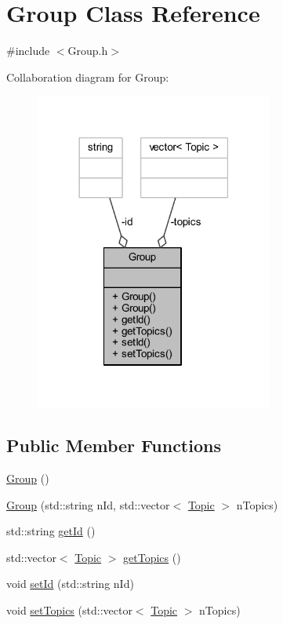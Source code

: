 \hypertarget{class_group}{}\section{Group Class Reference}
\label{class_group}


{\ttfamily \#include $<$Group.\+h$>$}



Collaboration diagram for Group\+:\nopagebreak
\begin{figure}[H]
\begin{center}
\leavevmode
\includegraphics[width=222pt]{class_group__coll__graph}
\end{center}
\end{figure}
\subsection*{Public Member Functions}
\begin{DoxyCompactItemize}
\item 
\hyperlink{class_group_a7b74f9ac68e0504ccf2e2854b7355ff1}{Group} ()
\item 
\hyperlink{class_group_ac3639ca791bff4ceeaeba9e3fe4c1835}{Group} (std\+::string n\+Id, std\+::vector$<$ \hyperlink{class_topic}{Topic} $>$ n\+Topics)
\item 
std\+::string \hyperlink{class_group_ac28178935f780582ce7f5f518d43b6f8}{get\+Id} ()
\item 
std\+::vector$<$ \hyperlink{class_topic}{Topic} $>$ \hyperlink{class_group_a160daa5f96a8203bd30340dfc1810af1}{get\+Topics} ()
\item 
void \hyperlink{class_group_aba314538b0284ebfdf2e89fcdeef8697}{set\+Id} (std\+::string n\+Id)
\item 
void \hyperlink{class_group_ab37f8ac624dedf6eb84e2603e9c51df2}{set\+Topics} (std\+::vector$<$ \hyperlink{class_topic}{Topic} $>$ n\+Topics)
\end{DoxyCompactItemize}
